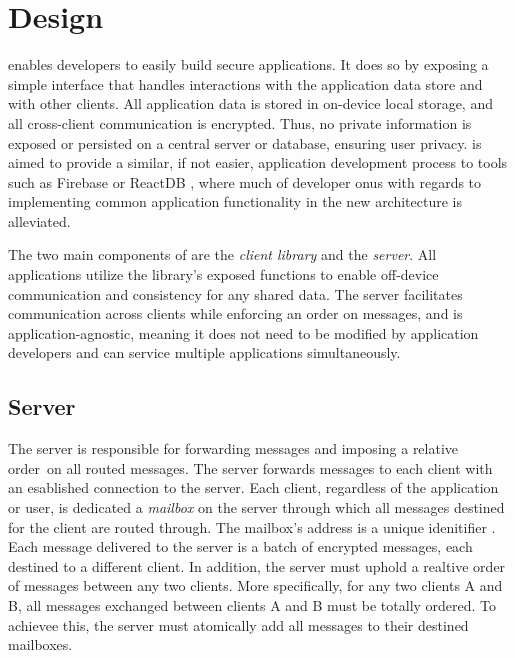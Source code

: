 \section{Design}

\name{} enables developers to easily build secure applications. It does so by exposing a simple interface that handles interactions with the application data store and with other clients. All application data is stored in on-device local storage, and all cross-client communication is encrypted. Thus, no private information is exposed or persisted on a central server or database, ensuring user privacy. \name{} is aimed to provide a similar, if not easier, application development process to tools such as Firebase  or ReactDB \tocite{}, where much of developer onus with regards to implementing common application functionality in the new architecture is alleviated.

The two main components of \name{} are the \textit{client library} and the \textit{\name{} server}. All \name{} applications utilize the library's exposed functions to enable off-device communication and consistency for any shared data. The server facilitates communication across clients while enforcing an order on messages, and is application-agnostic, meaning it does not need to be modified by application developers and can service multiple applications simultaneously. 

\subsection{Server}
The server is responsible for forwarding messages and imposing a relative order\ on all routed messages. The server forwards messages to each client with an esablished connection to the server. Each client, regardless of the application or user, is dedicated a \textit{mailbox} on the server through which all messages destined for the client are routed through. The mailbox's address is a unique idenitifier . Each message delivered to the server is a batch of encrypted messages, each destined to a different client. In addition, the server must uphold a realtive order of messages between any two clients. More specifically, for any two clients A and B, all messages exchanged between clients A and B must be totally ordered. To achievee this, the server must atomically add all messages to their destined mailboxes. 


